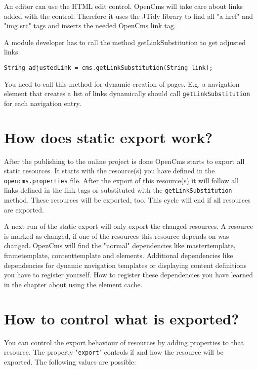 An editor can use the HTML edit control. OpenCms will take care about links added with the control. Therefore it uses the JTidy library to find all "a href" and "img src" tags and inserts the needed OpenCms link tag.

A module developer has to call the method getLinkSubstitution to get adjusted links:

\texttt{String adjustedLink = cms.getLinkSubstitution(String link);}

You need to call this method for dynamic creation of pages. E.g. a navigation element that creates a list of links dynamically should call \texttt{getLinkSubstitution} for each navigation entry.

\section{How does static export work?}

After the publishing to the online project is done OpenCms starts to export all static resources. It starts with the resource(s) you have defined in the \texttt{opencms.properties} file. After the export of this resource(s) it will follow all links defined in the link tags or substituted with the \texttt{getLinkSubstitution } method. These resources will be exported, too. This cycle will end if all resources are exported.

A next run of the static export will only export the changed resources. A resource is marked as changed, if one of the resources this resource depends on was changed. OpenCms will find the "normal" dependencies like mastertemplate, frametemplate, contenttemplate and elements. Additional dependencies like dependencies for dynamic navigation templates or displaying content definitions you have to register yourself. How to register these dependencies you have learned in the chapter about using the element cache.

\section{How to control what is exported?}

You can control the export behaviour of resources by adding properties to that resource. The property "\texttt{export}" controls if and how the resource will be exported. The following values are possible:

